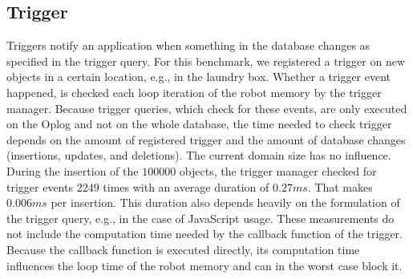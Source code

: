 \subsection{Trigger}
\label{sec:eval-trigger}
Triggers notify an application when something in the database changes
as specified in the trigger query. For this benchmark, we registered a
trigger on new objects in a certain location, e.g., in the laundry
box. Whether a trigger event happened, is checked each loop iteration of
the robot memory by the trigger manager. Because trigger queries,
which check for these events, are only executed on the Oplog and not
on the whole database, the time needed to check trigger depends on the
amount of registered trigger and the amount of database changes
(insertions, updates, and deletions). The current domain size has no
influence. During the insertion of the $100000$ objects, the trigger
manager checked for trigger events $2249$ times with an average
duration of $0.27ms$. That makes $0.006ms$ per insertion. This
duration also depends heavily on the formulation of the trigger query,
e.g., in the case of JavaScript usage. These measurements do not
include the computation time needed by the callback function of the
trigger. Because the callback function is executed directly, its
computation time influences the loop time of the robot memory and can
in the worst case block it.

